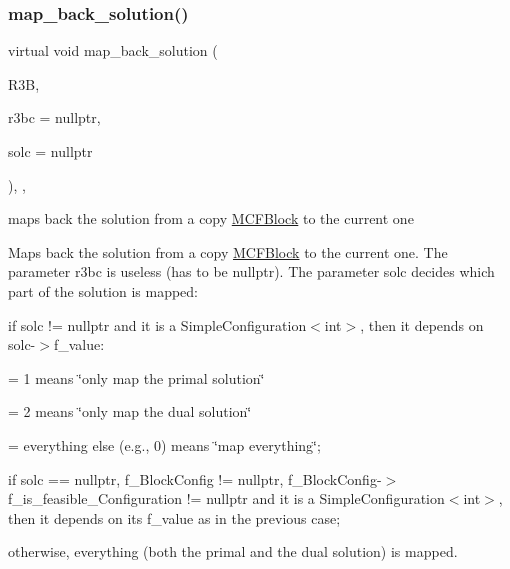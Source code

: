 \subsubsection{\texorpdfstring{map\+\_\+back\+\_\+solution()}{map\_back\_solution()}}
{\footnotesize\ttfamily virtual void map\+\_\+back\+\_\+solution (\begin{DoxyParamCaption}\item[{\mbox{\hyperlink{class_s_m_spp__di__unipi__it_1_1_block}{Block}} $\ast$}]{R3B,  }\item[{\mbox{\hyperlink{class_s_m_spp__di__unipi__it_1_1_configuration}{Configuration}} $\ast$}]{r3bc = {\ttfamily nullptr},  }\item[{\mbox{\hyperlink{class_s_m_spp__di__unipi__it_1_1_configuration}{Configuration}} $\ast$}]{solc = {\ttfamily nullptr} }\end{DoxyParamCaption})\hspace{0.3cm}{\ttfamily [final]}, {\ttfamily [override]}, {\ttfamily [virtual]}}



maps back the solution from a copy \mbox{\hyperlink{class_s_m_spp__di__unipi__it_1_1_m_c_f_block}{M\+C\+F\+Block}} to the current one 

Maps back the solution from a copy \mbox{\hyperlink{class_s_m_spp__di__unipi__it_1_1_m_c_f_block}{M\+C\+F\+Block}} to the current one. The parameter r3bc is useless (has to be nullptr). The parameter solc decides which part of the solution is mapped\+:


\begin{DoxyItemize}
\item if solc != nullptr and it is a Simple\+Configuration$<$int$>$, then it depends on solc-\/$>$f\+\_\+value\+:

= 1 means \char`\"{}only map the primal solution\char`\"{}

= 2 means \char`\"{}only map the dual solution\char`\"{}

= everything else (e.\+g., 0) means \char`\"{}map everything\char`\"{};
\item if solc == nullptr, f\+\_\+\+Block\+Config != nullptr, f\+\_\+\+Block\+Config-\/$>$f\+\_\+is\+\_\+feasible\+\_\+\+Configuration != nullptr and it is a Simple\+Configuration$<$int$>$, then it depends on its f\+\_\+value as in the previous case;
\item otherwise, everything (both the primal and the dual solution) is mapped.
\end{DoxyItemize}

